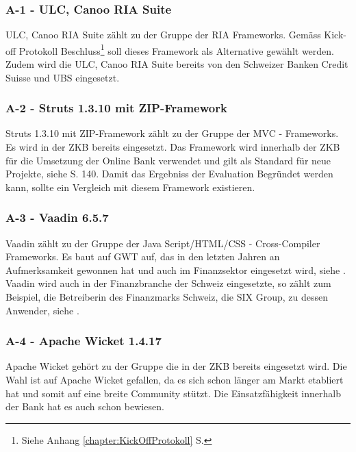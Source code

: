   \subsubsection{A-1 - ULC, Canoo RIA Suite}
  
  ULC, Canoo RIA Suite zählt zu der Gruppe der \ac{RIA} Frameworks. Gemäss
  Kick-off Protokoll Beschluss\footnote{Siehe Anhang
  \ref{chapter:KickOffProtokoll}  S.
  \pageref{chapter:KickOffProtokoll}} soll dieses Framework als Alternative
  gewählt werden. Zudem wird die ULC, Canoo RIA Suite bereits von den Schweizer
  Banken Credit Suisse und UBS eingesetzt.
  
  \subsubsection{A-2 - Struts 1.3.10 mit ZIP-Framework}
  
  Struts 1.3.10 mit ZIP-Framework zählt zu der Gruppe der MVC - Frameworks. Es
  wird in der \ac{ZKB} bereits eingesetzt. Das Framework wird innerhalb der
  \ac{ZKB} für die Umsetzung der Online Bank verwendet und gilt als Standard
  für neue Projekte, siehe \cite{ZkbHandbuchDerItArchitektur}  S. 140. Damit
  das Ergebniss der Evaluation Begründet werden kann, sollte ein Vergleich mit
  diesem Framework existieren.
  
  \subsubsection{A-3 - Vaadin 6.5.7}
  
  Vaadin zählt zu der Gruppe der Java Script/\ac{HTML}/\ac{CSS} -
  Cross-Compiler Frameworks. Es baut auf \ac{GWT} auf, das in den letzten
  Jahren an Aufmerksamkeit gewonnen hat und auch im Finanzsektor eingesetzt
  wird, siehe \cite{GWTImFinanzSektor}. Vaadin wird auch in der Finanzbranche
  der Schweiz eingesetzte, so zählt zum Beispiel, die Betreiberin des
  Finanzmarks Schweiz, die SIX Group, zu dessen Anwender, siehe
  \cite{VaadinInDerSchweiz}.
  
  \subsubsection{A-4 - Apache Wicket 1.4.17}
  
  Apache Wicket gehört zu der Gruppe die in der ZKB bereits eingesetzt wird.
  Die Wahl ist auf Apache Wicket gefallen, da es sich schon länger am Markt
  etabliert hat und somit auf eine breite Community stützt. Die
  Einsatzfähigkeit innerhalb der Bank  hat es auch schon bewiesen.
  

